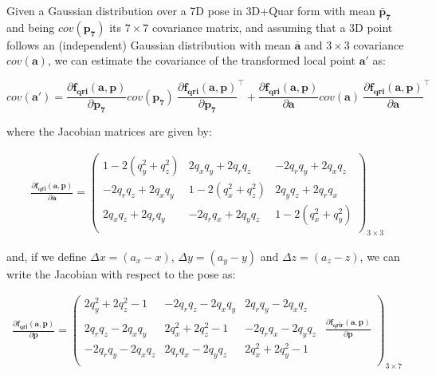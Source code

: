 \documentclass[a4paper,11pt]{report}
\begin{document}
Given a Gaussian distribution over a 7D pose in 3D+Quar form with
mean $\mathbf{\bar{p}_7}$ and being $cov(\mathbf{p_7})$ its $7 \times 7$ covariance matrix,
and assuming that a 3D point follows an (independent) Gaussian distribution
with mean $\mathbf{\bar{a}}$ and $3 \times 3$ covariance $cov(\mathbf{a})$,
we can estimate the covariance of the transformed local point $\mathbf{a'}$
as:

\begin{equation}
cov(\mathbf{a'}) =
\frac{\partial \mathbf{f_{qri}}( \mathbf{a}, \mathbf{p} )}{\partial \mathbf{p_7}}
cov(\mathbf{p_7})  ~
\frac{\partial \mathbf{f_{qri}}( \mathbf{a}, \mathbf{p} )}{\partial \mathbf{p_7}}^\top
+
\frac{\partial \mathbf{f_{qri}}( \mathbf{a}, \mathbf{p} )}{\partial \mathbf{a}}
cov(\mathbf{a})  ~
\frac{\partial \mathbf{f_{qri}}( \mathbf{a}, \mathbf{p} )}{\partial \mathbf{a}}^\top
\end{equation}

\noindent where the Jacobian matrices are given by:

\begin{eqnarray}
\frac{ \partial \mathbf{f_{qri}}( \mathbf{a}, \mathbf{p} )}{\partial \mathbf{a}} =
\left(\begin{array}{ccc}
1 - 2 (q_y^2 + q_z^2)   &    2 q_x q_y + 2 q_r q_z  &     - 2 q_r q_y + 2 q_x q_z \\
-2 q_r q_z + 2 q_x q_y &   1 - 2 (q_x^2 + q_z^2) &   2 q_y q_z + 2 q_r q_x \\
2 q_x q_z + 2 q_r q_y &   -2 q_r q_x + 2 q_y q_z & 1 - 2 (q_x^2 + q_y^2 ) \\
\end{array}\right)_{3 \times 3}
\end{eqnarray}

\noindent and, if we define
$\Delta x = (a_x - x)$, $\Delta y = (a_y - y)$ and $\Delta z = (a_z - z)$, we can
write the Jacobian with respect to the pose as:

\begin{eqnarray}
\label{eq:df_qri_p}
\frac{ \partial \mathbf{f_{qri}}( \mathbf{a}, \mathbf{p} )}{\partial \mathbf{p}} =
\left(\begin{array}{ccc|c}
2 q_y^2 + 2 q_z^2 - 1 &   -2 q_r q_z - 2 q_x q_y &  2 q_r q_y - 2 q_x q_z &  ~
\\
2 q_r q_z - 2 q_x q_y &  2 q_x^2 + 2 q_z^2 - 1   &  -2 q_r q_x - 2 q_y q_z &
  \frac{ \partial \mathbf{f_{qrir}}( \mathbf{a}, \mathbf{p} )}{\partial \mathbf{p}}
\\
-2 q_r q_y - 2 q_x q_z &  2 q_r q_x - 2 q_y q_z &  2 q_x^2 + 2 q_y^2 - 1 & ~
\\
\end{array}\right)_{3 \times 7}
\end{eqnarray}
\end{document}
